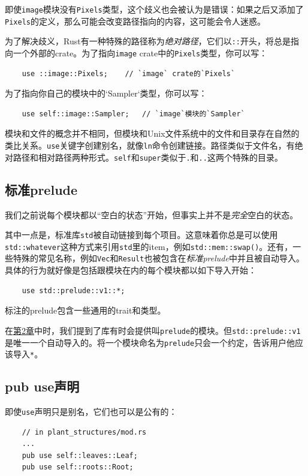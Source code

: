 即使\texttt{image}模块没有\texttt{Pixels}类型，这个歧义也会被认为是错误：如果之后又添加了\texttt{Pixels}的定义，那么可能会改变路径指向的内容，这可能会令人迷惑。

为了解决歧义，Rust有一种特殊的路径称为\emph{绝对路径}，它们以\texttt{::}开头，将总是指向一个外部的crate。为了指向\texttt{image} crate中的\texttt{Pixels}类型，你可以写：
\begin{verbatim}
    use ::image::Pixels;    // `image` crate的`Pixels`
\end{verbatim}

为了指向你自己的模块中的`Sampler`类型，你可以写：
\begin{verbatim}
    use self::image::Sampler;   // `image`模块的`Sampler`
\end{verbatim}

模块和文件的概念并不相同，但模块和Unix文件系统中的文件和目录存在自然的类比关系。\texttt{use}关键字创建别名，就像\texttt{ln}命令创建链接。路径类似于文件名，有绝对路径和相对路径两种形式。\texttt{self}和\texttt{super}类似于\texttt{.}和\texttt{..}这两个特殊的目录。

\subsection{标准prelude}
我们之前说每个模块都以“空白的状态”开始，但事实上并不是\emph{完全}空白的状态。

其中一点是，标准库\texttt{std}被自动链接到每个项目。这意味着你总是可以使用\texttt{std::whatever}这种方式来引用\texttt{std}里的item，例如\texttt{std::mem::swap()}。还有，一些特殊的常见名称，例如\texttt{Vec}和\texttt{Result}也被包含在\emph{标准prelude}中并且被自动导入。具体的行为就好像是包括跟模块在内的每个模块都以如下导入开始：
\begin{verbatim}
    use std::prelude::v1::*;
\end{verbatim}

标注的prelude包含一些通用的trait和类型。

在\hyperref[ch02]{第2章}中时，我们提到了库有时会提供叫\texttt{prelude}的模块。但\texttt{std::prelude::v1}是唯一一个自动导入的。将一个模块命名为\texttt{prelude}只会一个约定，告诉用户他应该导入\texttt{*}。

\subsection{pub use声明}
即使\texttt{use}声明只是别名，它们也可以是公有的：
\begin{verbatim}
    // in plant_structures/mod.rs
    ...
    pub use self::leaves::Leaf;
    pub use self::roots::Root;
\end{verbatim}

